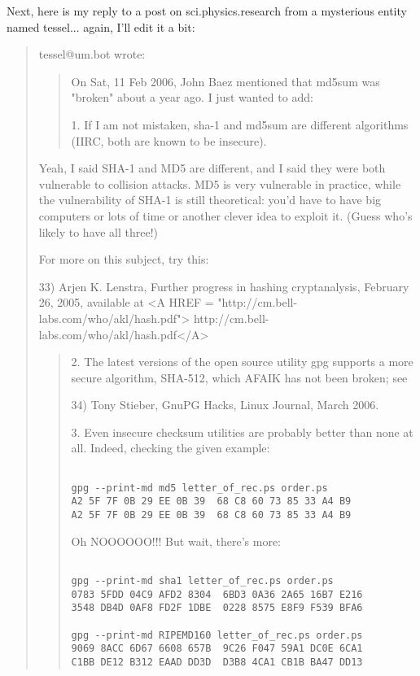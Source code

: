 Next, here is my reply to a post on sci.physics.research
from a mysterious entity named tessel... again, I'll edit it a bit:

\begin{quote}
tessel@um.bot wrote:

\begin{quote}
On Sat, 11 Feb 2006, John Baez mentioned that md5sum was "broken" about a 
year ago.  I just wanted to add:

1. If I am not mistaken, sha-1 and md5sum are different algorithms (IIRC, 
both are known to be insecure). 

\end{quote}
Yeah, I said SHA-1 and MD5 are different, and I said they were both vulnerable
to collision attacks.  MD5 is very vulnerable in practice, while the
vulnerability of SHA-1 is still theoretical: you'd have to have big 
computers or lots of time or another clever idea to exploit it.  
(Guess who's likely to have all three!)

For more on this subject, try this:

33) Arjen K. Lenstra, Further progress in hashing cryptanalysis,
February 26, 2005, available at 
<A HREF = "http://cm.bell-labs.com/who/akl/hash.pdf">
http://cm.bell-labs.com/who/akl/hash.pdf</A>

\begin{quote}
2. The latest versions of the open source utility gpg supports a more 
secure algorithm, SHA-512, which AFAIK has not been broken; see

34) Tony Stieber, GnuPG Hacks, Linux Journal, March 2006.

3. Even insecure checksum utilities are probably better than none at all. 
Indeed, checking the given example:


\begin{verbatim}

gpg --print-md md5 letter_of_rec.ps order.ps
A2 5F 7F 0B 29 EE 0B 39  68 C8 60 73 85 33 A4 B9
A2 5F 7F 0B 29 EE 0B 39  68 C8 60 73 85 33 A4 B9
\end{verbatim}
    

Oh NOOOOOO!!!  But wait, there's more:

\begin{verbatim}

gpg --print-md sha1 letter_of_rec.ps order.ps
0783 5FDD 04C9 AFD2 8304  6BD3 0A36 2A65 16B7 E216
3548 DB4D 0AF8 FD2F 1DBE  0228 8575 E8F9 F539 BFA6

gpg --print-md RIPEMD160 letter_of_rec.ps order.ps
9069 8ACC 6D67 6608 657B  9C26 F047 59A1 DC0E 6CA1
C1BB DE12 B312 EAAD DD3D  D3B8 4CA1 CB1B BA47 DD13
\end{verbatim}
    

\end{quote}
\end{quote}
